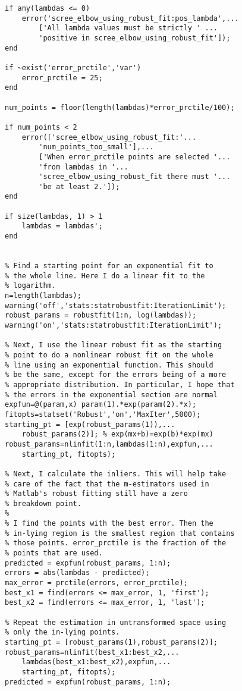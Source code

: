 \documentclass[eric_thesis.tex]{subfiles}
\begin{document}
\begin{lstlisting}
if any(lambdas <= 0)
    error('scree_elbow_using_robust_fit:pos_lambda',...
        ['All lambda values must be strictly ' ...
        'positive in scree_elbow_using_robust_fit']);
end

if ~exist('error_prctile','var')
    error_prctile = 25;
end

num_points = floor(length(lambdas)*error_prctile/100);

if num_points < 2
    error(['scree_elbow_using_robust_fit:'...
        'num_points_too_small'],...
        ['When error_prctile points are selected '...
        'from lambdas in '...
        'scree_elbow_using_robust_fit there must '...
        'be at least 2.']);
end

if size(lambdas, 1) > 1
    lambdas = lambdas';
end


% Find a starting point for an exponential fit to
% the whole line. Here I do a linear fit to the
% logarithm.
n=length(lambdas);
warning('off','stats:statrobustfit:IterationLimit');
robust_params = robustfit(1:n, log(lambdas));
warning('on','stats:statrobustfit:IterationLimit');

% Next, I use the linear robust fit as the starting
% point to do a nonlinear robust fit on the whole
% line using an exponential function. This should
% be the same, except for the errors being of a more
% appropriate distribution. In particular, I hope that
% the errors in the exponential section are normal
expfun=@(param,x) param(1).*exp(param(2).*x);
fitopts=statset('Robust','on','MaxIter',5000);
starting_pt = [exp(robust_params(1)),...
    robust_params(2)]; % exp(mx+b)=exp(b)*exp(mx)
robust_params=nlinfit(1:n,lambdas(1:n),expfun,...
    starting_pt, fitopts);

% Next, I calculate the inliers. This will help take
% care of the fact that the m-estimators used in
% Matlab's robust fitting still have a zero
% breakdown point.
%
% I find the points with the best error. Then the
% in-lying region is the smallest region that contains
% those points. error_prctile is the fraction of the
% points that are used.
predicted = expfun(robust_params, 1:n);
errors = abs(lambdas - predicted);
max_error = prctile(errors, error_prctile);
best_x1 = find(errors <= max_error, 1, 'first');
best_x2 = find(errors <= max_error, 1, 'last');

% Repeat the estimation in untransformed space using
% only the in-lying points. 
starting_pt = [robust_params(1),robust_params(2)];
robust_params=nlinfit(best_x1:best_x2,...
    lambdas(best_x1:best_x2),expfun,...
    starting_pt, fitopts);
predicted = expfun(robust_params, 1:n);


\end{lstlisting}
\end{document}

